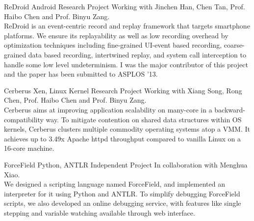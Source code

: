 \documentclass[11pt,a4paper]{moderncv}
\begin{document}
\vspace*{0.2\baselineskip}
{ReDroid}
{Android}
{Research Project}{}
{Working with Jinchen Han, Chen Tan, Prof. Haibo Chen and Prof. Binyu Zang. \\
ReDroid is an event-centric record and replay framework that targets
smartphone platforms. We ensure its replayability as well as low
recording overhead by optimization techniques including fine-grained
UI-event based recording, coarse-grained data based recording,
intertwined replay, and system call interception to handle some low
level undeterminism. I was the major contributor of this project and the paper has been submitted to ASPLOS '13.
}

\vspace*{0.2\baselineskip}
{Cerberus}
{Xen, Linux Kernel}
{Research Project}{}
{Working with Xiang Song, Rong Chen, Prof. Haibo Chen and Prof. Binyu Zang. \\
Cerberus aims at improving application scalability on many-core in a
backward-compatibility way. To mitigate contention on shared data
structures within OS kernels, Cerberus clusters multiple commodity
operating systems atop a VMM. It achieves up to 3.49x Apache httpd
throughput compared to vanilla Linux on a 16-core machine.
}




{ForceField}
{Python, ANTLR}
{Independent Project}{}
{In collaboration with Menghua Xiao. \\
We designed a scripting language named ForceField, and implemented an
interpreter for it using Python and ANTLR. To simplify debugging
ForceField scripts, we also developed an online debugging service,
with features like single stepping and variable watching available
through web interface.
}
\end{document}
